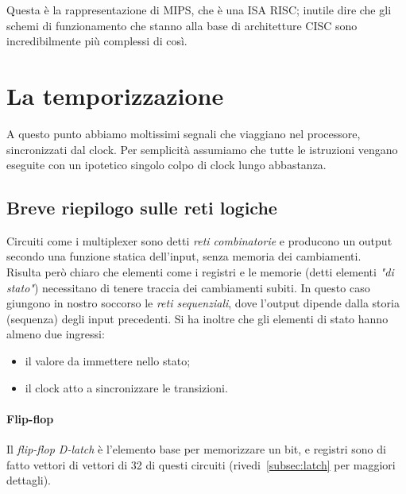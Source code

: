 \documentclass[class=book, crop=false, oneside]{standalone}
\begin{document}
Questa è la rappresentazione di MIPS, che è una ISA RISC; inutile dire che gli schemi di funzionamento che stanno alla base di architetture CISC sono incredibilmente più complessi di così.

\section{La temporizzazione}
A questo punto abbiamo moltissimi segnali che viaggiano nel processore, sincronizzati dal clock. Per semplicità assumiamo che tutte le istruzioni vengano eseguite con un ipotetico singolo colpo di clock lungo abbastanza.

\subsection{Breve riepilogo sulle reti logiche}
Circuiti come i multiplexer sono detti \emph{reti combinatorie} e producono un output secondo una funzione statica dell'input, senza memoria dei cambiamenti.\\
Risulta però chiaro che elementi come i registri e le memorie (detti elementi \emph{"di stato"}) necessitano di tenere traccia dei cambiamenti subiti. In questo caso giungono in nostro soccorso le \emph{reti sequenziali}, dove l'output dipende dalla storia (sequenza) degli input precedenti. Si ha inoltre che gli elementi di stato hanno almeno due ingressi:
\begin{itemize}
	\item il valore da immettere nello stato;
	\item il clock atto a sincronizzare le transizioni.
\end{itemize}

\paragraph{Flip-flop}
Il \emph{flip-flop D-latch} è l’elemento base per memorizzare un bit, e registri sono di fatto vettori di vettori di 32 di questi circuiti (rivedi~\ref{subsec:latch} per maggiori dettagli).
\end{document}
